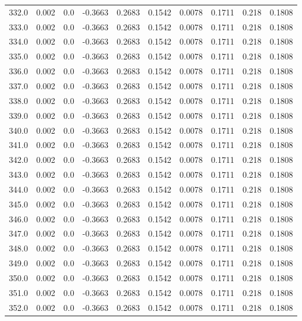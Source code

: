 \begin{longtable}{lrrrrrrrrr}
332.0 & 0.002 & 0.0 & -0.3663 & 0.2683 & 0.1542 & 0.0078 & 0.1711 & 0.218 & 0.1808 \\
333.0 & 0.002 & 0.0 & -0.3663 & 0.2683 & 0.1542 & 0.0078 & 0.1711 & 0.218 & 0.1808 \\
334.0 & 0.002 & 0.0 & -0.3663 & 0.2683 & 0.1542 & 0.0078 & 0.1711 & 0.218 & 0.1808 \\
335.0 & 0.002 & 0.0 & -0.3663 & 0.2683 & 0.1542 & 0.0078 & 0.1711 & 0.218 & 0.1808 \\
336.0 & 0.002 & 0.0 & -0.3663 & 0.2683 & 0.1542 & 0.0078 & 0.1711 & 0.218 & 0.1808 \\
337.0 & 0.002 & 0.0 & -0.3663 & 0.2683 & 0.1542 & 0.0078 & 0.1711 & 0.218 & 0.1808 \\
338.0 & 0.002 & 0.0 & -0.3663 & 0.2683 & 0.1542 & 0.0078 & 0.1711 & 0.218 & 0.1808 \\
339.0 & 0.002 & 0.0 & -0.3663 & 0.2683 & 0.1542 & 0.0078 & 0.1711 & 0.218 & 0.1808 \\
340.0 & 0.002 & 0.0 & -0.3663 & 0.2683 & 0.1542 & 0.0078 & 0.1711 & 0.218 & 0.1808 \\
341.0 & 0.002 & 0.0 & -0.3663 & 0.2683 & 0.1542 & 0.0078 & 0.1711 & 0.218 & 0.1808 \\
342.0 & 0.002 & 0.0 & -0.3663 & 0.2683 & 0.1542 & 0.0078 & 0.1711 & 0.218 & 0.1808 \\
343.0 & 0.002 & 0.0 & -0.3663 & 0.2683 & 0.1542 & 0.0078 & 0.1711 & 0.218 & 0.1808 \\
344.0 & 0.002 & 0.0 & -0.3663 & 0.2683 & 0.1542 & 0.0078 & 0.1711 & 0.218 & 0.1808 \\
345.0 & 0.002 & 0.0 & -0.3663 & 0.2683 & 0.1542 & 0.0078 & 0.1711 & 0.218 & 0.1808 \\
346.0 & 0.002 & 0.0 & -0.3663 & 0.2683 & 0.1542 & 0.0078 & 0.1711 & 0.218 & 0.1808 \\
347.0 & 0.002 & 0.0 & -0.3663 & 0.2683 & 0.1542 & 0.0078 & 0.1711 & 0.218 & 0.1808 \\
348.0 & 0.002 & 0.0 & -0.3663 & 0.2683 & 0.1542 & 0.0078 & 0.1711 & 0.218 & 0.1808 \\
349.0 & 0.002 & 0.0 & -0.3663 & 0.2683 & 0.1542 & 0.0078 & 0.1711 & 0.218 & 0.1808 \\
350.0 & 0.002 & 0.0 & -0.3663 & 0.2683 & 0.1542 & 0.0078 & 0.1711 & 0.218 & 0.1808 \\
351.0 & 0.002 & 0.0 & -0.3663 & 0.2683 & 0.1542 & 0.0078 & 0.1711 & 0.218 & 0.1808 \\
352.0 & 0.002 & 0.0 & -0.3663 & 0.2683 & 0.1542 & 0.0078 & 0.1711 & 0.218 & 0.1808 \\

\end{longtable}

